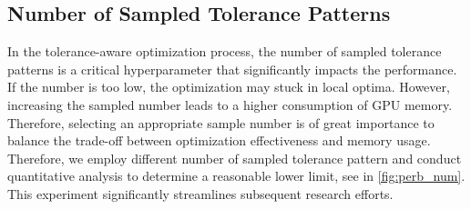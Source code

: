 \subsection{Number of Sampled Tolerance Patterns}
In the tolerance-aware optimization process, the number of sampled tolerance patterns is a critical hyperparameter that significantly impacts the performance. If the number is too low, the optimization may stuck in local optima. However, increasing the sampled number leads to a higher consumption of GPU memory. Therefore, selecting an appropriate sample number is of great importance to balance the trade-off between optimization effectiveness and memory usage. Therefore, we employ different number of sampled tolerance pattern and conduct quantitative analysis to determine a reasonable lower limit, see in \cref{fig:perb_num}. This experiment significantly streamlines subsequent research efforts.
